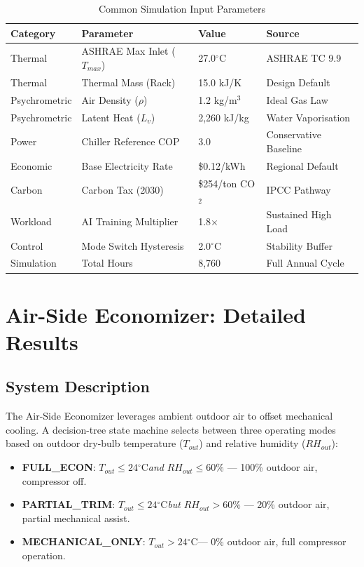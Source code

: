 \documentclass[12pt,a4paper]{report}
\newcommand{\degC}{$^{\circ}$C}
\begin{document}
\begin{table}[H]
\centering
\caption{Common Simulation Input Parameters}
\label{tab:sim_params}
\renewcommand{\arraystretch}{1.3}
\begin{tabular}{llll}
\toprule
\textbf{Category} & \textbf{Parameter} & \textbf{Value} & \textbf{Source} \\
\midrule
Thermal & ASHRAE Max Inlet ($T_{max}$) & 27.0\degC & ASHRAE TC 9.9 \\
Thermal & Thermal Mass (Rack) & 15.0 kJ/K & Design Default \\
Psychrometric & Air Density ($\rho$) & 1.2 kg/m$^3$ & Ideal Gas Law \\
Psychrometric & Latent Heat ($L_v$) & 2{,}260 kJ/kg & Water Vaporisation \\
Power & Chiller Reference COP & 3.0 & Conservative Baseline \\
Economic & Base Electricity Rate & \$0.12/kWh & Regional Default \\
Carbon & Carbon Tax (2030) & \$254/ton CO$_2$ & IPCC Pathway \\
Workload & AI Training Multiplier & 1.8$\times$ & Sustained High Load \\
Control & Mode Switch Hysteresis & 2.0\degC & Stability Buffer \\
Simulation & Total Hours & 8{,}760 & Full Annual Cycle \\
\bottomrule
\end{tabular}
\end{table}

\newpage

\chapter{Air-Side Economizer: Detailed Results}
\label{ch:air}

\section{System Description}

The Air-Side Economizer leverages ambient outdoor air to offset mechanical cooling.
A decision-tree state machine selects between three operating modes based on outdoor
dry-bulb temperature ($T_{out}$) and relative humidity ($RH_{out}$):

\begin{itemize}[noitemsep]
  \item \textbf{FULL\_ECON}: $T_{out} \leq 24$\degC \textit{and} $RH_{out} \leq 60\%$ --- 100\% outdoor air, compressor off.
  \item \textbf{PARTIAL\_TRIM}: $T_{out} \leq 24$\degC \textit{but} $RH_{out} > 60\%$ --- 20\% outdoor air, partial mechanical assist.
  \item \textbf{MECHANICAL\_ONLY}: $T_{out} > 24$\degC --- 0\% outdoor air, full compressor operation.
\end{itemize}
\end{document}
